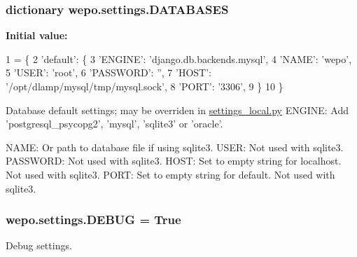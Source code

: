 \hypertarget{namespacewepo_1_1settings_a7c1f9a17ae1a4cfa095e42b10e071f82}{
\subsubsection[{D\-A\-T\-A\-B\-A\-S\-E\-S}]{\setlength{\rightskip}{0pt plus 5cm}dictionary wepo.\-settings.\-D\-A\-T\-A\-B\-A\-S\-E\-S}}\label{namespacewepo_1_1settings_a7c1f9a17ae1a4cfa095e42b10e071f82}
{\bfseries Initial value\-:}
\begin{DoxyCode}
1 = \{
2    \textcolor{stringliteral}{'default'}: \{
3       \textcolor{stringliteral}{'ENGINE'}:   \textcolor{stringliteral}{'django.db.backends.mysql'},
4       \textcolor{stringliteral}{'NAME'}:     \textcolor{stringliteral}{'wepo'},
5       \textcolor{stringliteral}{'USER'}:     \textcolor{stringliteral}{'root'},
6       \textcolor{stringliteral}{'PASSWORD'}: \textcolor{stringliteral}{''},
7       \textcolor{stringliteral}{'HOST'}:     \textcolor{stringliteral}{'/opt/dlamp/mysql/tmp/mysql.sock'},
8       \textcolor{stringliteral}{'PORT'}:     \textcolor{stringliteral}{'3306'},
9    \}
10 \}
\end{DoxyCode}


Database default settings; may be overriden in \hyperlink{settings__local_8py}{settings\-\_\-local.\-py} E\-N\-G\-I\-N\-E\-: Add 'postgresql\-\_\-psycopg2', 'mysql', 'sqlite3' or 'oracle'. 

N\-A\-M\-E\-: Or path to database file if using sqlite3. U\-S\-E\-R\-: Not used with sqlite3. P\-A\-S\-S\-W\-O\-R\-D\-: Not used with sqlite3. H\-O\-S\-T\-: Set to empty string for localhost. Not used with sqlite3. P\-O\-R\-T\-: Set to empty string for default. Not used with sqlite3. \hypertarget{namespacewepo_1_1settings_a892de685064f9fb7550c2f85f84f2992}{
\subsubsection[{D\-E\-B\-U\-G}]{\setlength{\rightskip}{0pt plus 5cm}wepo.\-settings.\-D\-E\-B\-U\-G = True}}\label{namespacewepo_1_1settings_a892de685064f9fb7550c2f85f84f2992}


Debug settings. 

